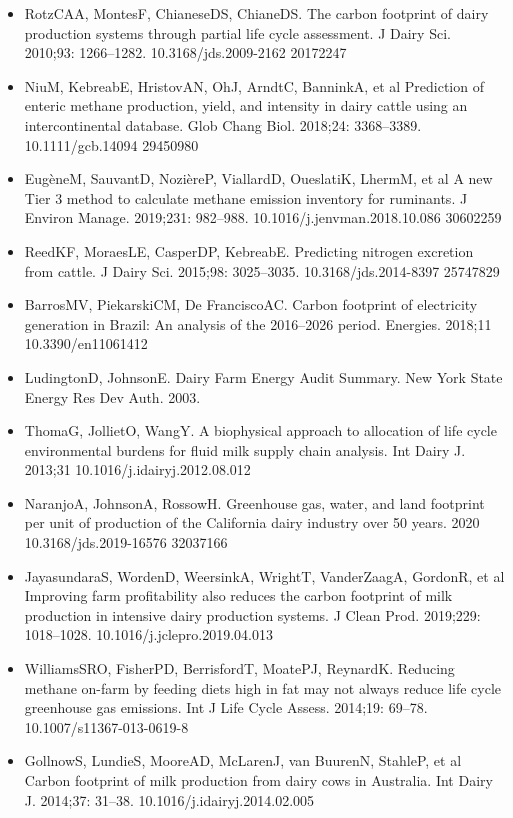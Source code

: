 \documentclass[11pt,a4paper]{article}
\begin{document}
\begin{itemize}
\item RotzCAA, MontesF, ChianeseDS, ChianeDS. The carbon footprint of dairy production systems through partial life cycle assessment. J Dairy Sci. 2010;93: 1266–1282. 10.3168/jds.2009-2162 20172247
\item NiuM, KebreabE, HristovAN, OhJ, ArndtC, BanninkA, et al Prediction of enteric methane production, yield, and intensity in dairy cattle using an intercontinental database. Glob Chang Biol. 2018;24: 3368–3389. 10.1111/gcb.14094 29450980
\item EugèneM, SauvantD, NozièreP, ViallardD, OueslatiK, LhermM, et al A new Tier 3 method to calculate methane emission inventory for ruminants. J Environ Manage. 2019;231: 982–988. 10.1016/j.jenvman.2018.10.086 30602259
\item ReedKF, MoraesLE, CasperDP, KebreabE. Predicting nitrogen excretion from cattle. J Dairy Sci. 2015;98: 3025–3035. 10.3168/jds.2014-8397 25747829
\item BarrosMV, PiekarskiCM, De FranciscoAC. Carbon footprint of electricity generation in Brazil: An analysis of the 2016–2026 period. Energies. 2018;11 10.3390/en11061412
\item LudingtonD, JohnsonE. Dairy Farm Energy Audit Summary. New York State Energy Res Dev Auth. 2003.
\item ThomaG, JollietO, WangY. A biophysical approach to allocation of life cycle environmental burdens for fluid milk supply chain analysis. Int Dairy J. 2013;31 10.1016/j.idairyj.2012.08.012
\item NaranjoA, JohnsonA, RossowH. Greenhouse gas, water, and land footprint per unit of production of the California dairy industry over 50 years. 2020 10.3168/jds.2019-16576 32037166
\item JayasundaraS, WordenD, WeersinkA, WrightT, VanderZaagA, GordonR, et al Improving farm profitability also reduces the carbon footprint of milk production in intensive dairy production systems. J Clean Prod. 2019;229: 1018–1028. 10.1016/j.jclepro.2019.04.013
\item WilliamsSRO, FisherPD, BerrisfordT, MoatePJ, ReynardK. Reducing methane on-farm by feeding diets high in fat may not always reduce life cycle greenhouse gas emissions. Int J Life Cycle Assess. 2014;19: 69–78. 10.1007/s11367-013-0619-8
\item GollnowS, LundieS, MooreAD, McLarenJ, van BuurenN, StahleP, et al Carbon footprint of milk production from dairy cows in Australia. Int Dairy J. 2014;37: 31–38. 10.1016/j.idairyj.2014.02.005

\end{itemize}
\end{document}
